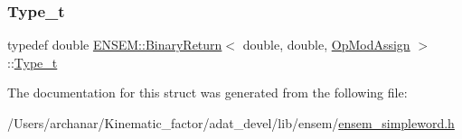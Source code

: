 \mbox{\label{structENSEM_1_1BinaryReturn_3_01double_00_01double_00_01OpModAssign_01_4_a5d4ff64f4601dee1ca69a78e3ed694e0}} 
\subsubsection{\texorpdfstring{Type\_t}{Type\_t}\hspace{0.1cm}{\footnotesize\ttfamily [2/2]}}
{\footnotesize\ttfamily typedef double \mbox{\hyperlink{structENSEM_1_1BinaryReturn}{E\+N\+S\+E\+M\+::\+Binary\+Return}}$<$ double, double, \mbox{\hyperlink{structENSEM_1_1OpModAssign}{Op\+Mod\+Assign}} $>$\+::\mbox{\hyperlink{structENSEM_1_1BinaryReturn_3_01double_00_01double_00_01OpModAssign_01_4_a5d4ff64f4601dee1ca69a78e3ed694e0}{Type\+\_\+t}}}



The documentation for this struct was generated from the following file\+:\begin{DoxyCompactItemize}
\item 
/\+Users/archanar/\+Kinematic\+\_\+factor/adat\+\_\+devel/lib/ensem/\mbox{\hyperlink{lib_2ensem_2ensem__simpleword_8h}{ensem\+\_\+simpleword.\+h}}\end{DoxyCompactItemize}
